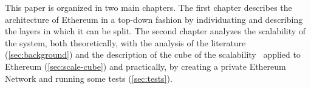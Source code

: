 This paper is organized in two main chapters. The first chapter describes the
architecture of Ethereum in a top-down fashion by individuating and describing
the layers in which it can be split. The second chapter analyzes the scalability
of the system, both theoretically, with the analysis of the literature
(\autoref{sec:background}) and the description of the cube of the
scalability~\cite{bib:art-of-scalability} applied to Ethereum
(\autoref{sec:scale-cube}) and practically, by creating a private Ethereum
Network and running some tests (\autoref{sec:tests}).

